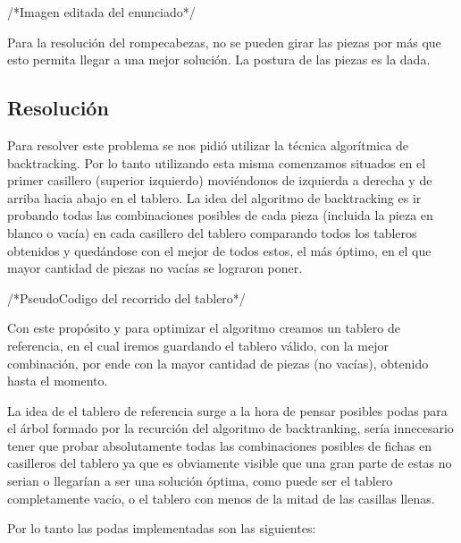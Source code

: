 /*Imagen editada del enunciado*/

Para la resoluci\'on del rompecabezas, no se pueden girar las piezas por más que esto permita llegar a una mejor soluci\'on. La postura de las piezas es la dada.

\subsection{Resoluci\'on}

Para resolver este problema se nos pidi\'o utilizar la t\'ecnica algor\'itmica de backtracking. Por lo tanto utilizando esta misma comenzamos situados en el primer casillero (superior izquierdo) movi\'endonos de izquierda a derecha y de arriba hacia abajo en el tablero. La idea del algoritmo de backtracking es ir probando todas las combinaciones posibles de cada pieza (incluida la pieza en blanco o vac\'ia) en cada casillero del tablero comparando todos los tableros obtenidos y qued\'andose con el mejor de todos estos, el m\'as \'optimo, en el que mayor cantidad de piezas no vac\'ias se lograron poner.

/*PseudoCodigo del recorrido del tablero*/

Con este prop\'osito y para optimizar el algoritmo creamos un tablero de referencia, en el cual iremos guardando el tablero v\'alido, con la mejor combinaci\'on, por ende con la mayor cantidad de piezas (no vac\'ias), obtenido hasta el momento.

La idea de el tablero de referencia surge a la hora de pensar posibles podas para el \'arbol formado por la recurci\'on del algoritmo de backtranking, ser\'ia innecesario tener que probar absolutamente todas las combinaciones posibles de fichas en casilleros del tablero ya que es obviamente visible que una gran parte de estas no serian o llegar\'ian a ser una soluci\'on \'optima, como puede ser el tablero completamente vac\'io, o el tablero con menos de la mitad de las casillas llenas.

Por lo tanto las podas implementadas son las siguientes:

